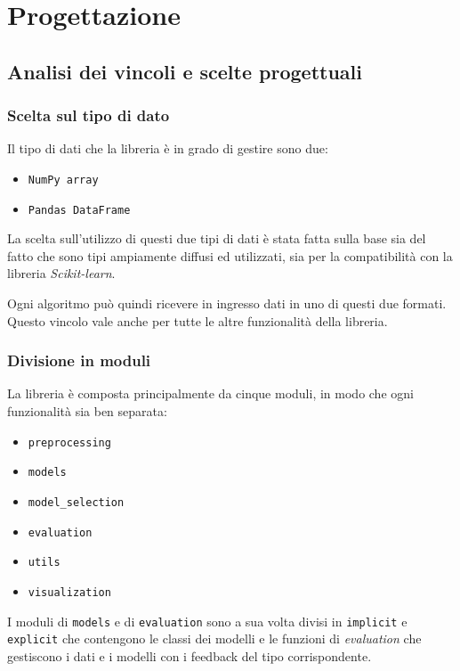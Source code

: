 \chapter{Progettazione}

\section{Analisi dei vincoli e scelte progettuali}

\subsection{Scelta sul tipo di dato}

Il tipo di dati che la libreria è in grado di gestire sono due:

\begin{itemize}
    \item \texttt{NumPy array}
    \item \texttt{Pandas DataFrame}
\end{itemize}

La scelta sull'utilizzo di questi due tipi di dati è stata fatta sulla base sia del fatto che sono tipi ampiamente diffusi ed utilizzati, sia per la compatibilità con la libreria \textit{Scikit-learn}.

Ogni algoritmo può quindi ricevere in ingresso dati in uno di questi due formati. Questo vincolo vale anche per tutte le altre funzionalità della libreria.


\subsection{Divisione in moduli}

La libreria è composta principalmente da cinque moduli, in modo che ogni funzionalità sia ben separata:

\begin{itemize}
    \item \texttt{preprocessing}
    \item \texttt{models}
    \item \texttt{model\_selection}
    \item \texttt{evaluation}
    \item \texttt{utils}
    \item \texttt{visualization}
\end{itemize}

I moduli di \texttt{models} e di \texttt{evaluation} sono a sua volta divisi in \texttt{implicit} e \texttt{explicit} che contengono le classi dei modelli e le funzioni di \textit{evaluation} che gestiscono i dati e i modelli con i feedback del tipo corrispondente.

